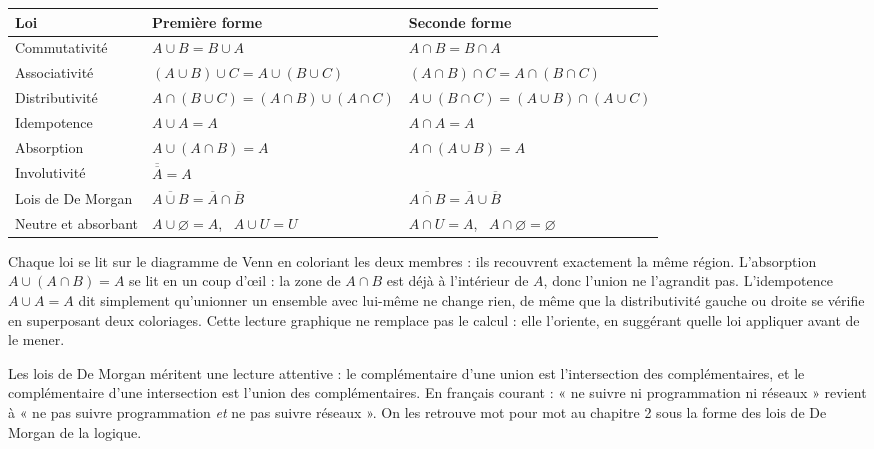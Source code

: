 \begin{center}
\small
\begin{tabular}{L{4.2cm}L{5.7cm}L{5.7cm}}
\toprule
{}\textbf{Loi} & \textbf{Première forme} & \textbf{Seconde forme}\\
\midrule
Commutativité & $A \cup B = B \cup A$ & $A \cap B = B \cap A$\\
Associativité & $(A \cup B) \cup C = A \cup (B \cup C)$ & $(A \cap B) \cap C = A \cap (B \cap C)$\\
Distributivité & $A \cap (B \cup C) = (A \cap B) \cup (A \cap C)$ & $A \cup (B \cap C) = (A \cup B) \cap (A \cup C)$\\
Idempotence & $A \cup A = A$ & $A \cap A = A$\\
Absorption & $A \cup (A \cap B) = A$ & $A \cap (A \cup B) = A$\\
Involutivité & \\
Lois de De Morgan & $\overline{A \cup B} = \overline{A} \cap \overline{B}$ & $\overline{A \cap B} = \overline{A} \cup \overline{B}$\\
Neutre et absorbant & $A \cup \varnothing = A$, \ $A \cup U = U$ & $A \cap U = A$, \ $A \cap \varnothing = \varnothing$\\
\bottomrule
\end{tabular}
\label{ch1:tab:lois}
\end{center}

Chaque loi se lit sur le diagramme de Venn en coloriant les deux membres : ils recouvrent exactement la même région. L'absorption $A \cup (A \cap B) = A$ se lit en un coup d'œil : la zone de $A \cap B$ est déjà à l'intérieur de $A$, donc l'union ne l'agrandit pas. L'idempotence $A \cup A = A$ dit simplement qu'unionner un ensemble avec lui-même ne change rien, de même que la distributivité gauche ou droite se vérifie en superposant deux coloriages. Cette lecture graphique ne remplace pas le calcul : elle l'oriente, en suggérant quelle loi appliquer avant de le mener.

Les lois de De Morgan méritent une lecture attentive : le complémentaire d'une union est l'intersection des complémentaires, et le complémentaire d'une intersection est l'union des complémentaires. En français courant : « ne suivre ni programmation ni réseaux » revient à « ne pas suivre programmation \emph{et} ne pas suivre réseaux ». On les retrouve mot pour mot au chapitre 2 sous la forme des lois de De Morgan de la logique.


